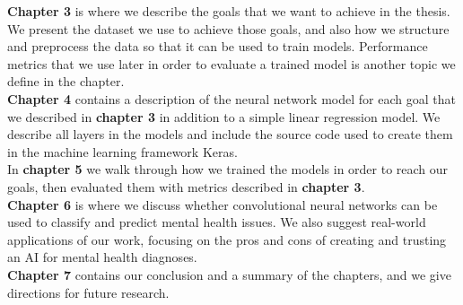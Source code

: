 \noindent \textbf{Chapter 3} is where we describe the goals that we want to achieve in the thesis. We present the dataset we use to achieve those goals, and also how we structure and preprocess the data so that it can be used to train models. Performance metrics that we use later in order to evaluate a trained model is another topic we define in the chapter.\\

\noindent \textbf{Chapter 4} contains a description of the neural network model for each goal that we described in \textbf{chapter 3} in addition to a simple linear regression model. We describe all layers in the models and include the source code used to create them in the machine learning framework Keras. \\

\noindent In \textbf{chapter 5} we walk through how we trained the models in order to reach our goals, then evaluated them with metrics described in \textbf{chapter 3}. \\

\noindent \textbf{Chapter 6} is where we discuss whether convolutional neural networks can be used to classify and predict mental health issues. We also suggest real-world applications of our work, focusing on the pros and cons of creating and trusting an AI for mental health diagnoses. \\

\noindent \textbf{Chapter 7} contains our conclusion and a summary of the chapters, and we give directions for future research.